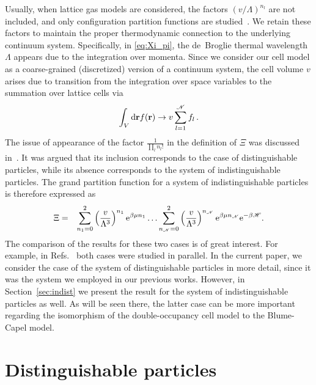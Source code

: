 \documentclass[pdflatex,sn-mathphys-num]{sn-jnl}%
\theoremstyle{thmstyleone}%
\theoremstyle{thmstyletwo}%
\theoremstyle{thmstylethree}%
\begin{document}
	Usually, when lattice gas models are considered, the factors $(v/\Lambda)^{n_l}$ are not included, and only configuration partition functions are studied~\cite{FriedliVelenik17}. We retain these factors to maintain the proper thermodynamic connection to the underlying continuum system. Specifically, in \eqref{eq:Xi_pi}, the de~Broglie thermal wavelength $\Lambda$ appears due to the integration over momenta. Since we consider our cell model as a coarse-grained (discretized) version of a continuum system, the cell volume $v$ arises due to transition from the integration over space variables to the summation over lattice cells via
	\begin{equation}
		\int_V {\rm d} {\vb{r}}f(\vb{r}) \to v \sum_{l=1}^{\mathscr{N}}f_l \,.
	\end{equation}
	The issue of appearance of the factor $\frac{1}{\prod_l n_l!}$ in the definition of $\Xi$ was discussed in~\cite{FL18}. It was argued that its inclusion corresponds to the case of distinguishable particles, while its absence corresponds to the system of indistinguishable particles. The grand partition function for a system of indistinguishable particles is therefore expressed as
	\begin{eqnarray}
		\label{Xi:indist}
		\Xi & = & \sum_{n_1 = 0}^2 \left(\frac{v}{\Lambda^3}\right)^{n_1} {\rm e}^{\beta\mu n_1} \ldots \sum_{n_{\mathscr{N}} = 0}^2 \left(\frac{v}{\Lambda^3}\right)^{n_{\mathscr{N}}} {\rm e}^{\beta\mu n_{\mathscr{N}}} {\rm e}^{-\beta\mathscr{H}}.
	\end{eqnarray}
	The comparison of the results for these two cases is of great interest. For example, in Refs.~\cite{FL18, FL20} both cases were studied in parallel. In the current paper, we consider the case of the system of distinguishable particles in more detail, since it was the system we employed in our previous works. However, in Section~\ref{sec:indist} we present the result for the system of indistinguishable particles as well. As will be seen there, the latter case can be more important regarding the isomorphism of the double-occupancy cell model to the Blume-Capel model.
	
	\section{Distinguishable particles}\label{sec:distinct}
	
\end{document}
